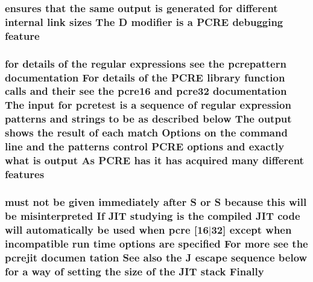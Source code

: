 \subsubsection[{\texorpdfstring{feature}{feature}}]{ ensures that the same {\bf output} {\bf is} {\bf generated} for different internal link sizes The {\bf D} {\bf modifier} {\bf is} {\bf a} {\bf P\+C\+RE} debugging feature}\hypertarget{pcretest_8txt_ad99f003de35ca2bbebd63899cc92c194}{}\label{pcretest_8txt_ad99f003de35ca2bbebd63899cc92c194}
\subsubsection[{\texorpdfstring{features}{features}}]{\setlength{\rightskip}{0pt plus 5cm}for {\bf details} {\bf of} the regular {\bf expressions} see the {\bf pcrepattern} {\bf documentation} For {\bf details} {\bf of} the {\bf P\+C\+RE} {\bf library} {\bf function} {\bf calls} and their see the {\bf pcre16} and {\bf pcre32} {\bf documentation} The {\bf input} for {\bf pcretest} {\bf is} {\bf a} {\bf sequence} {\bf of} regular {\bf expression} {\bf patterns} and {\bf strings} {\bf to} {\bf be} {\bf as} described {\bf below} The {\bf output} shows the {\bf result} {\bf of} each {\bf match} Options {\bf on} the {\bf command} {\bf line} and the {\bf patterns} control {\bf P\+C\+RE} {\bf options} and {\bf exactly} {\bf what} {\bf is} {\bf output} As {\bf P\+C\+RE} has {\bf it} has acquired many different {\bf features}}\hypertarget{pcretest_8txt_a52c7dac1bda054932fd8d369da496546}{}\label{pcretest_8txt_a52c7dac1bda054932fd8d369da496546}
\subsubsection[{\texorpdfstring{Finally}{Finally}}]{ must {\bf not} {\bf be} {\bf given} immediately {\bf after} {\bf S} {\bf or} {\bf S} because {\bf this} will {\bf be} misinterpreted If J\+IT {\bf studying} {\bf is} the {\bf compiled} J\+IT {\bf code} will automatically {\bf be} {\bf used} when {\bf pcre} \mbox{[}16$\vert$32\mbox{]} {\bf except} when incompatible {\bf run} {\bf time} {\bf options} {\bf are} {\bf specified} For more see the pcrejit documen tation See also the {\bf J} escape {\bf sequence} {\bf below} for {\bf a} {\bf way} {\bf of} {\bf setting} the {\bf size} {\bf of} the J\+IT {\bf stack} Finally}\hypertarget{pcretest_8txt_aa0ae2806ea7215aa09721fffbc9578d8}{}\label{pcretest_8txt_aa0ae2806ea7215aa09721fffbc9578d8}
